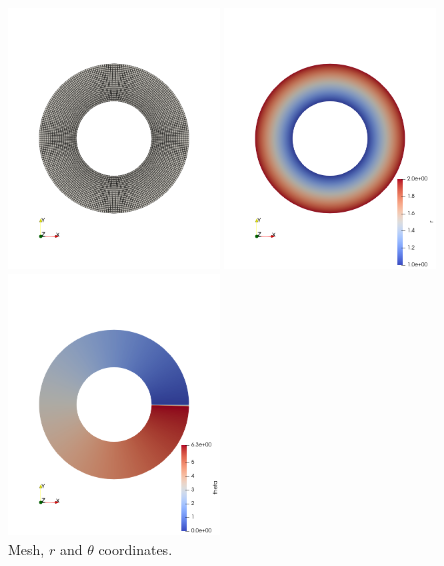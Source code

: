 \begin{center}
\includegraphics[width=5.6cm]{./python_codes/fieldstone_151/images/mesh}
\includegraphics[width=5.6cm]{./python_codes/fieldstone_151/images/r}
\includegraphics[width=5.6cm]{./python_codes/fieldstone_151/images/theta}\\
{\captionfont Mesh, $r$ and $\theta$ coordinates.}
\end{center}

